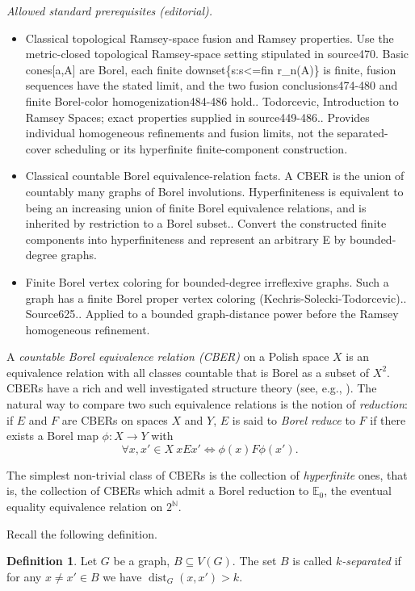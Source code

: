\documentclass[10pt,a4paper]{amsart}
\newcommand{\N}{\mathbb{N}}
\theoremstyle{definition}
\newtheorem{definition}[theorem]{Definition}
\DeclareMathOperator{\dist}{dist}
\begin{document}
\noindent\textit{Allowed standard prerequisites (editorial).}\begin{itemize}
\item Classical topological Ramsey-space fusion and Ramsey properties. Use the metric-closed topological Ramsey-space setting stipulated in source470. Basic cones[a,A] are Borel, each finite downset\{s:s<=fin r\_n(A)\} is finite, fusion sequences have the stated limit, and the two fusion conclusions474-480 and finite Borel-color homogenization484-486 hold.. Todorcevic, Introduction to Ramsey Spaces; exact properties supplied in source449-486.. Provides individual homogeneous refinements and fusion limits, not the separated-cover scheduling or its hyperfinite finite-component construction.
\item Classical countable Borel equivalence-relation facts. A CBER is the union of countably many graphs of Borel involutions. Hyperfiniteness is equivalent to being an increasing union of finite Borel equivalence relations, and is inherited by restriction to a Borel subset.. Convert the constructed finite components into hyperfiniteness and represent an arbitrary E by bounded-degree graphs.
\item Finite Borel vertex coloring for bounded-degree irreflexive graphs. Such a graph has a finite Borel proper vertex coloring (Kechris-Solecki-Todorcevic).. Source625.. Applied to a bounded graph-distance power before the Ramsey homogeneous refinement.
\end{itemize}\medskip
	A \emph{countable Borel equivalence relation (CBER)} on a Polish space $X$ is an equivalence relation with all classes countable that is Borel as a subset of $X^2$. CBERs have a rich and well investigated structure theory (see, e.g., \cite{kechris2024theory}). The natural way to compare two such equivalence relations is the notion of \emph{reduction}: if $E$ and $F$ are CBERs on spaces $X$ and $Y$, $E$ is said to \emph{Borel reduce} to $F$ if there exists a Borel map $\phi:X \to Y$ with
	\[\forall x,x' \in X \ xEx' \iff \phi(x)F\phi(x').\]
	
	The simplest non-trivial class of CBERs is the collection of \emph{hyperfinite} ones, that is, the collection of CBERs which admit a Borel reduction to $\mathbb{E}_0$, the eventual equality equivalence relation on $2^\N$. 

	Recall the following definition. 
	\begin{definition}
		Let $G$ be a graph, $B \subseteq V(G)$. The set $B$ is called \emph{$k$-separated} if for any $x \neq x' \in B$ we have $\dist_{G}(x,x')>k$.
	\end{definition}
\end{document}
